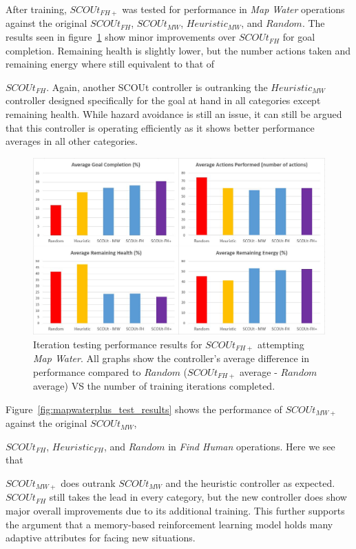 After training, $SCOUt_{FH+}$ was tested for performance in \textit{Map Water} operations against the original $SCOUt_{FH}$, $SCOUt_{MW}$, $Heuristic_{MW}$, and $Random$.
The results seen in figure~\ref{fig:findhumanplus_test_results} show minor improvements over $SCOUt_{FH}$ for goal completion.
Remaining health is slightly lower, but the number actions taken and remaining energy where still equivalent to that of

\noindent
$SCOUt_{FH}$.
Again, another SCOUt controller is outranking the $Heuristic_{MW}$ controller designed specifically for the goal at hand in all categories except remaining health.
While hazard avoidance is still an issue, it can still be argued that this controller is operating efficiently as it shows better performance averages in all other categories.

\begin{figure}[H]
  \centering
  \includegraphics[width=1.0\columnwidth]{Figures/Results/Experiment2/AdditionalTraining/FindHumanPlus.JPG}
  \caption[Experiment 2 - Additional Training Testing Results: $SCOUt_{FH+}$]{Iteration testing performance results for $SCOUt_{FH+}$ attempting \textit{Map Water}. All graphs show the controller's average difference in performance compared to $Random$ ($SCOUt_{FH+}$ average - $Random$ average) VS the number of training iterations completed.}
  \label{fig:findhumanplus_test_results}
\end{figure}


Figure~\ref{fig:mapwaterplus_test_results} shows the performance of $SCOUt_{MW+}$ against the original $SCOUt_{MW}$,

\noindent
$SCOUt_{FH}$, $Heuristic_{FH}$, and $Random$ in \textit{Find Human} operations.
Here we see that

\noindent
$SCOUt_{MW+}$ does outrank $SCOUt_{MW}$ and the heuristic controller as expected.
$SCOUt_{FH}$ still takes the lead in every category, but the new controller does show major overall improvements due to its additional training.
This further supports the argument that a memory-based reinforcement learning model holds many adaptive attributes for facing new situations.


